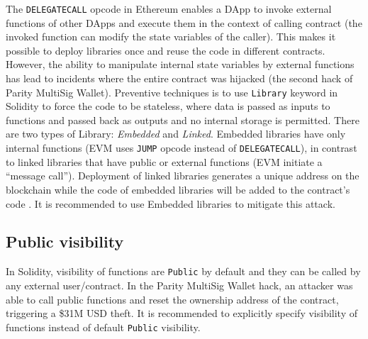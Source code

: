 The \texttt{DELEGATECALL} opcode in Ethereum enables a DApp to invoke external functions of other DApps and execute them in the context of calling contract (\ie the invoked function can modify the state variables of the caller). This makes it possible to deploy libraries once and reuse the code in different contracts. However, the ability to manipulate internal state variables by external functions has lead to incidents where the entire contract was hijacked (\cf the second hack of Parity MultiSig Wallet\cite{ParitySecondHack}). Preventive techniques is to use \texttt{Library} keyword in Solidity to force the code to be stateless, where data is passed as inputs to functions and passed back as outputs and no internal storage is permitted\cite{LIB1}. There are two types of Library: \textit{Embedded} and \textit{Linked}. Embedded libraries have only internal functions (EVM uses \texttt{JUMP} opcode instead of \texttt{DELEGATECALL}), in contrast to linked libraries that have public or external functions (EVM initiate a ``message call''). Deployment of linked libraries generates a unique address on the blockchain while the code of embedded libraries will be added to the contract's code \cite{LIB2}. It is recommended to use Embedded libraries to mitigate this attack.

\subsection{Public visibility}\label{subsec:pvis}

In Solidity, visibility of functions are \texttt{Public} by default and they can be called by any external user/contract. In the Parity MultiSig Wallet hack\cite{ParityFirstHack}, an attacker was able to call public functions and reset the ownership address of the contract, triggering a \$31M USD theft. It is recommended to explicitly specify visibility of functions instead of default \texttt{Public} visibility.



